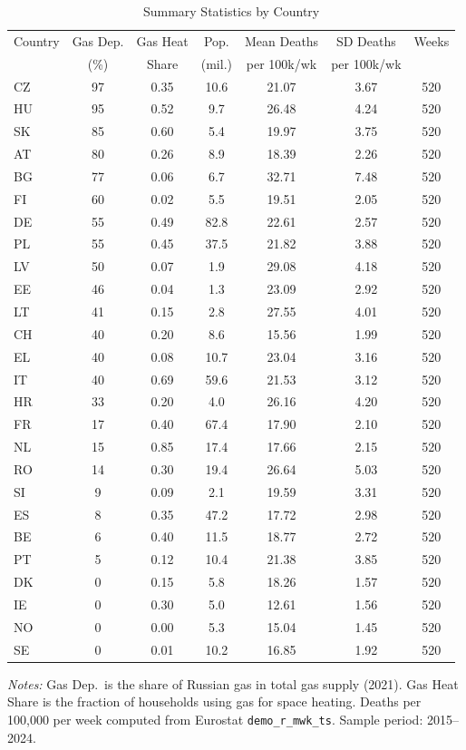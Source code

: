 \begin{table}[!htbp]
\centering
\caption{Summary Statistics by Country}
\label{tab:sumstats}
\footnotesize
\begin{tabular}{lcccccc}
\hline\hline
Country & Gas Dep. & Gas Heat & Pop. & Mean Deaths & SD Deaths & Weeks \\
 & (\%) & Share & (mil.) & per 100k/wk & per 100k/wk & \\
\hline
CZ & 97 & 0.35 & 10.6 & 21.07 & 3.67 & 520 \\
HU & 95 & 0.52 & 9.7 & 26.48 & 4.24 & 520 \\
SK & 85 & 0.60 & 5.4 & 19.97 & 3.75 & 520 \\
AT & 80 & 0.26 & 8.9 & 18.39 & 2.26 & 520 \\
BG & 77 & 0.06 & 6.7 & 32.71 & 7.48 & 520 \\
FI & 60 & 0.02 & 5.5 & 19.51 & 2.05 & 520 \\
DE & 55 & 0.49 & 82.8 & 22.61 & 2.57 & 520 \\
PL & 55 & 0.45 & 37.5 & 21.82 & 3.88 & 520 \\
LV & 50 & 0.07 & 1.9 & 29.08 & 4.18 & 520 \\
EE & 46 & 0.04 & 1.3 & 23.09 & 2.92 & 520 \\
LT & 41 & 0.15 & 2.8 & 27.55 & 4.01 & 520 \\
CH & 40 & 0.20 & 8.6 & 15.56 & 1.99 & 520 \\
EL & 40 & 0.08 & 10.7 & 23.04 & 3.16 & 520 \\
IT & 40 & 0.69 & 59.6 & 21.53 & 3.12 & 520 \\
HR & 33 & 0.20 & 4.0 & 26.16 & 4.20 & 520 \\
FR & 17 & 0.40 & 67.4 & 17.90 & 2.10 & 520 \\
NL & 15 & 0.85 & 17.4 & 17.66 & 2.15 & 520 \\
RO & 14 & 0.30 & 19.4 & 26.64 & 5.03 & 520 \\
SI & 9 & 0.09 & 2.1 & 19.59 & 3.31 & 520 \\
ES & 8 & 0.35 & 47.2 & 17.72 & 2.98 & 520 \\
BE & 6 & 0.40 & 11.5 & 18.77 & 2.72 & 520 \\
PT & 5 & 0.12 & 10.4 & 21.38 & 3.85 & 520 \\
DK & 0 & 0.15 & 5.8 & 18.26 & 1.57 & 520 \\
IE & 0 & 0.30 & 5.0 & 12.61 & 1.56 & 520 \\
NO & 0 & 0.00 & 5.3 & 15.04 & 1.45 & 520 \\
SE & 0 & 0.01 & 10.2 & 16.85 & 1.92 & 520 \\
\hline\hline
\end{tabular}
\begin{tablenotes}[flushleft]
\small
\item \textit{Notes:} Gas Dep.~is the share of Russian gas in total gas supply (2021). Gas Heat Share is the fraction of households using gas for space heating. Deaths per 100,000 per week computed from Eurostat \texttt{demo\_r\_mwk\_ts}. Sample period: 2015--2024.
\end{tablenotes}
\end{table}

